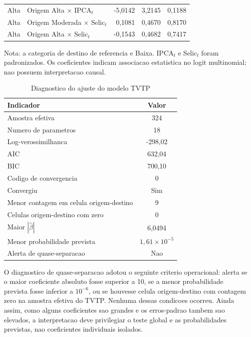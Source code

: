 \begin{table}[H]
\begin{tabular}{llrrr}
Alta & Origem Alta \(\times\) IPCA\(_t\) & -5,0142 & 3,2145 & 0,1188 \\
Alta & Origem Moderada \(\times\) Selic\(_t\) & 0,1081 & 0,4670 & 0,8170 \\
Alta & Origem Alta \(\times\) Selic\(_t\) & -0,1543 & 0,4682 & 0,7417 \\
\hline
\end{tabular}
\begin{flushleft}
\footnotesize Nota: a categoria de destino de referencia e Baixa. IPCA\(_t\) e Selic\(_t\) foram padronizados. Os coeficientes indicam associacao estatistica no logit multinomial; nao possuem interpretacao causal.
\end{flushleft}
\end{table}

\begin{table}[H]
\centering
\caption{Diagnostico do ajuste do modelo TVTP}
\label{tab:tvtp_diagnostico}
\begin{tabular}{lc}
\hline
Indicador & Valor \\
\hline
Amostra efetiva & 324 \\
Numero de parametros & 18 \\
Log-verossimilhanca & -298,02 \\
AIC & 632,04 \\
BIC & 700,10 \\
Codigo de convergencia & 0 \\
Convergiu & Sim \\
Menor contagem em celula origem-destino & 9 \\
Celulas origem-destino com zero & 0 \\
Maior \(|\widehat{\beta}|\) & 6,0494 \\
Menor probabilidade prevista & \(1,61\times 10^{-5}\) \\
Alerta de quase-separacao & Nao \\
\hline
\end{tabular}
\end{table}

O diagnostico de quase-separacao adotou o seguinte criterio operacional: alerta se o maior coeficiente absoluto fosse superior a 10, se a menor probabilidade prevista fosse inferior a \(10^{-6}\), ou se houvesse celula origem-destino com contagem zero na amostra efetiva do TVTP. Nenhuma dessas condicoes ocorreu. Ainda assim, como alguns coeficientes sao grandes e os erros-padrao tambem sao elevados, a interpretacao deve privilegiar o teste global e as probabilidades previstas, nao coeficientes individuais isolados.

